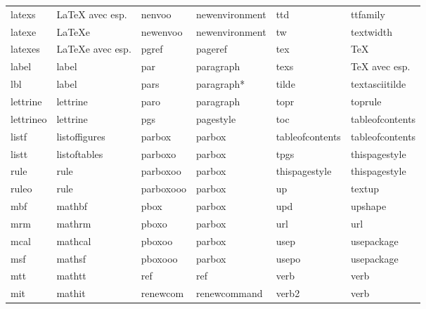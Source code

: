 \documentclass[11pt]{article}
\begin{document}
\begin{table}[!h]
{\begin{tabular}{llllll}
latexs           & LaTeX avec esp.        & nenvoo     & newenvironment & ttd             & ttfamily \\
latexe           & LaTeXe            & newenvoo   & newenvironment & tw              & textwidth \\
latexes          & LaTeXe avec esp.       & pgref      & pageref        & tex             & TeX \\
label            & label             & par        & paragraph      & texs            & TeX avec esp. \\
lbl              & label             & pars       & paragraph*     & tilde           & textasciitilde \\
lettrine         & lettrine          & paro       & paragraph      & topr            & toprule \\
lettrineo        & lettrine          & pgs        & pagestyle      & toc             & tableofcontents \\
listf            & listoffigures     & parbox     & parbox         & tableofcontents & tableofcontents \\
listt            & listoftables      & parboxo    & parbox         & tpgs            & thispagestyle \\
rule             & rule              & parboxoo   & parbox         & thispagestyle   & thispagestyle \\
ruleo            & rule              & parboxooo  & parbox         & up              & textup \\
mbf              & mathbf            & pbox       & parbox         & upd             & upshape \\
mrm              & mathrm            & pboxo      & parbox         & url             & url \\
mcal             & mathcal           & pboxoo     & parbox         & usep            & usepackage \\
msf              & mathsf            & pboxooo    & parbox         & usepo           & usepackage \\
mtt              & mathtt            & ref        & ref            & verb            & verb \\ 
mit              & mathit            & renewcom   & renewcommand   & verb2           & verb \\
\end{tabular}
}
\end{table}
\end{document}
